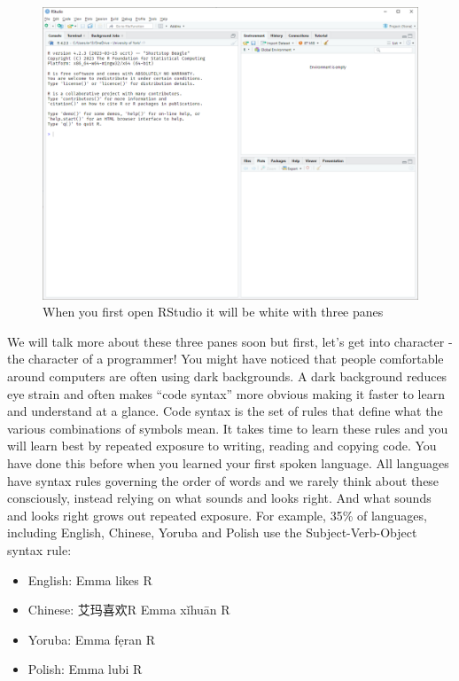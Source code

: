 \documentclass[
  letterpaper,
  DIV=11,
  numbers=noendperiod]{scrreprt}
\providecommand{\tightlist}{%
  \setlength{\itemsep}{0pt}\setlength{\parskip}{0pt}}\usepackage{longtable,booktabs,array}
\begin{document}
\begin{figure}

{\centering \includegraphics[width=8.33333in,height=\textheight]{images/rstudio-first-open.png}

}

\caption{\label{fig-rstudio-first-open}When you first open RStudio it
will be white with three panes}

\end{figure}

We will talk more about these three panes soon but first, let's get into
character - the character of a programmer! You might have noticed that
people comfortable around computers are often using dark backgrounds. A
dark background reduces eye strain and often makes ``code syntax'' more
obvious making it faster to learn and understand at a glance. Code
syntax is the set of rules that define what the various combinations of
symbols mean. It takes time to learn these rules and you will learn best
by repeated exposure to writing, reading and copying code. You have done
this before when you learned your first spoken language. All languages
have syntax rules governing the order of words and we rarely think about
these consciously, instead relying on what sounds and looks right. And
what sounds and looks right grows out repeated exposure. For example,
35\% of languages, including English, Chinese, Yoruba and Polish use the
Subject-Verb-Object syntax rule:

\begin{itemize}
\tightlist
\item
  English: Emma likes R
\item
  Chinese: 艾玛喜欢R Emma xǐhuān R
\item
  Yoruba: Emma fẹran R
\item
  Polish: Emma lubi R
\end{itemize}
\end{document}
